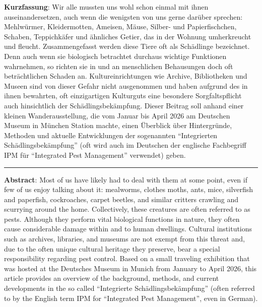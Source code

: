 \textbf{Kurzfassung}: Wir alle mussten uns wohl schon einmal mit ihnen
auseinandersetzen, auch wenn die wenigsten von uns gerne darüber
sprechen: Mehlwürmer, Kleidermotten, Ameisen, Mäuse, Silber- und
Papierfischchen, Schaben, Teppichkäfer und ähnliches Getier, das in der
Wohnung umherkreucht und fleucht. Zusammengefasst werden diese Tiere oft
als Schädlinge bezeichnet. Denn auch wenn sie biologisch betrachtet
durchaus wichtige Funktionen wahrnehmen, so richten sie in und an
menschlichen Behausungen doch oft beträchtlichen Schaden an.
Kultureinrichtungen wie Archive, Bibliotheken und Museen sind von dieser
Gefahr nicht ausgenommen und haben aufgrund des in ihnen bewahrten, oft
einzigartigen Kulturguts eine besondere Sorgfaltspflicht auch
hinsichtlich der Schädlingsbekämpfung. Dieser Beitrag soll anhand einer
kleinen Wanderausstellung, die vom Januar bis April 2026 am Deutschen
Museum in München Station machte, einen Überblick über Hintergründe,
Methoden und aktuelle Entwicklungen der sogenannten \enquote{Integrierten
Schädlingsbekämpfung} (oft wird auch im Deutschen der englische
Fachbegriff IPM für \enquote{Integrated Pest Management} verwendet) geben.

\begin{center}\rule{0.5\linewidth}{0.5pt}\end{center}

\noindent\textbf{Abstract}: Most of us have likely had to deal with them at some
point, even if few of us enjoy talking about it: mealworms, clothes
moths, ants, mice, silverfish and paperfish, cockroaches, carpet
beetles, and similar critters crawling and scurrying around the home.
Collectively, these creatures are often referred to as pests. Although
they perform vital biological functions in nature, they often cause
considerable damage within and to human dwellings. Cultural institutions
such as archives, libraries, and museums are not exempt from this threat
and, due to the often unique cultural heritage they preserve, bear a
special responsibility regarding pest control. Based on a small
traveling exhibition that was hosted at the Deutsches Museum in Munich
from January to April 2026, this article provides an overview of the
background, methods, and current developments in the so called
\enquote{Integrierte Schädlingsbekämpfung} (often referred to by the English
term IPM for \enquote{Integrated Pest Management}, even in German).
